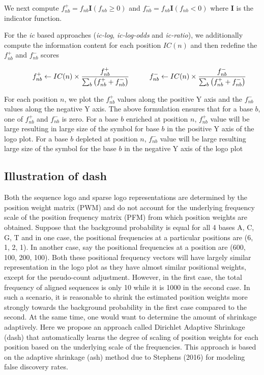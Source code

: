 \documentclass{bmcart}
\begin{document}
We next compute $f^{+}_{nb} =  f_{nb} \mathbf{I} ( f_{nb} \geq 0 )$ and $f^{-}_{nb} =  f_{nb} \mathbf{I} ( f_{nb} < 0 )$ where $\mathbf{I} $ is the indicator function.

For the \textit{ic} based approaches (\textit{ic-log}, \textit{ic-log-odds} and  \textit{ic-ratio}), we additionally compute the information content for each position $IC(n)$ and then redefine the $f^{+}_{nb}$ and $f^{-}_{nb}$ scores 

\begin{equation}\label{f_plus_minus}
\qquad  f^{+}_{nb} \leftarrow IC(n) \times \frac{f^{+}_{nb}}{\sum_{b} \left( f^{+}_{nb} + f^{-}_{nb} \right) } \hspace{1 cm} f^{-}_{nb} \leftarrow IC(n) \times \frac{f^{-}_{nb}}{\sum_{b} \left( f^{+}_{nb} + f^{-}_{nb} \right)}
\end{equation}

For each position $n$, we plot the $f^{+}_{nb}$ values along the positive Y axis and the $f^{-}_{nb}$ values along the negative Y axis. The above formulation ensures that for a base $b$, one of $f^{+}_{nb}$ and $f^{-}_{nb}$ is zero. For a base $b$ enriched at position $n$, $f^{+}_{nb}$ value will be large resulting in large size of the symbol for base $b$ in the positive Y axis of the logo plot. For a base $b$ depleted at position $n$, $f^{-}_{nb}$ value will be large resulting large size of the symbol for the base $b$ in the negative Y axis of the logo plot






\subsection*{Illustration of dash}

Both the sequence logo and sparse logo representations are determined by the position weight matrix (PWM) and do not account for the underlying frequency scale of the position frequency matrix (PFM) from which position weights are obtained. Suppose that the background probability is equal for all 4 bases A, C, G, T and in one case, the positional frequencies at a particular positions are (6, 1, 2, 1). In another case, say the positional frequencies at a position are (600, 100, 200, 100). Both these positional frequency vectors will have largely similar representation in the logo plot as they have almost similar positional weights, except for the pseudo-count adjustment. However, in the first case, the total frequency of aligned sequences is only 10 while it is 1000 in the second case. In such a scenario, it is reasonable to shrink the estimated position weights more strongly towards the background probability in the first case compared to the second. At the same time, one would want to determine the amount of shrinkage adaptively. Here we propose an approach called Dirichlet Adaptive Shrinkage (dash) that automatically learns the degree of scaling of position weights for each position based on the underlying scale of the frequencies. This approach is based on the adaptive shrinkage (ash) method due to Stephens (2016) \cite{Stephens2016} for modeling false discovery rates.
\end{document}
